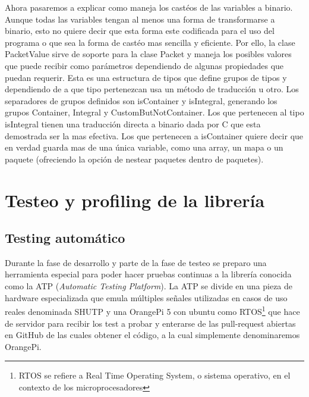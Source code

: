 \documentclass{report}
\begin{document}
Ahora pasaremos a explicar como maneja los castéos de las variables a binario. Aunque todas las variables tengan al menos una forma de transformarse a binario, esto no quiere decir que esta forma este codificada para el uso del programa o que sea la forma de castéo mas sencilla y eficiente. Por ello, la clase PacketValue sirve de soporte para la clase Packet y maneja los posibles valores que puede recibir como parámetros dependiendo de algunas propiedades que puedan requerir. Esta es una estructura de tipos que define grupos de tipos y dependiendo de a que tipo pertenezcan usa un método de traducción u otro. Los separadores de grupos definidos son isContainer y isIntegral, generando los grupos Container, Integral y CustomButNotContainer. Los que pertenecen al tipo isIntegral tienen una traducción directa a binario dada por C que esta demostrada ser la mas efectiva. Los que pertenecen a isContainer quiere decir que en verdad guarda mas de una única variable, como una array, un mapa o un paquete (ofreciendo la opción de nestear paquetes dentro de paquetes). 
\par \vspace{0.3 cm}

\subsubsection{}

\section{Testeo y profiling de la librería}
\subsection{Testing automático}
Durante la fase de desarrollo y parte de la fase de testeo se preparo una herramienta especial para poder hacer pruebas continuas a la librería conocida como la ATP (\textit{Automatic Testing Platform}). La ATP se divide en una pieza de hardware especializada que emula múltiples señales utilizadas en casos de uso reales denominada SHUTP y una OrangePi 5 con ubuntu como RTOS\footnote{RTOS se refiere a Real Time Operating System, o sistema operativo, en el contexto de los microprocesadores} que hace de servidor para recibir los test a probar y enterarse de las pull-request abiertas en GitHub de las cuales obtener el código, a la cual simplemente denominaremos OrangePi. \par \vspace{0.3cm}
\end{document}

